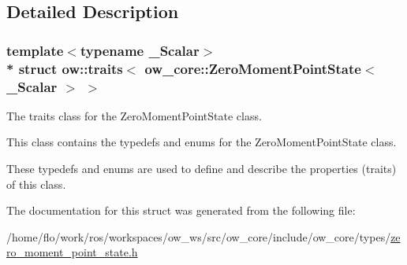 \subsection{Detailed Description}
\subsubsection*{template$<$typename \+\_\+\+Scalar$>$\\*
struct ow\+::traits$<$ ow\+\_\+core\+::\+Zero\+Moment\+Point\+State$<$ \+\_\+\+Scalar $>$ $>$}

The traits class for the Zero\+Moment\+Point\+State class. 

This class contains the typedefs and enums for the Zero\+Moment\+Point\+State class.

These typedefs and enums are used to define and describe the properties (traits) of this class. 

The documentation for this struct was generated from the following file\+:\begin{DoxyCompactItemize}
\item 
/home/flo/work/ros/workspaces/ow\+\_\+ws/src/ow\+\_\+core/include/ow\+\_\+core/types/\hyperlink{zero__moment__point__state_8h}{zero\+\_\+moment\+\_\+point\+\_\+state.\+h}\end{DoxyCompactItemize}
